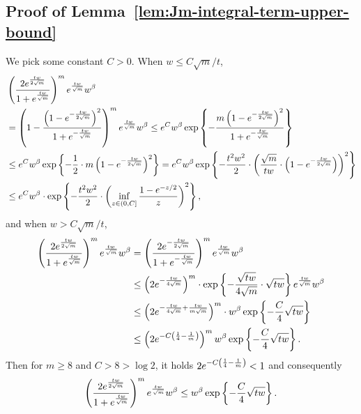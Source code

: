 \subsection{Proof of Lemma~\ref{lem:Jm-integral-term-upper-bound}} \label{proof:Jm-integral-term-upper-bound}
We pick some constant $C > 0$. When $w \leq C\sqrt{m}/t$,
\begin{align*}
	& \left({\frac{2e^{\frac{tw}{2\sqrt{m}}}}{1 + e^{\frac{tw}{\sqrt{m}}}}}\right)^{m} e^{\frac{tw}{\sqrt{m}}} w^\beta \nonumber \\
	& = \left({1 - \frac{\left({1-e^{-\frac{tw}{2\sqrt{m}}}}\right)^2}{1 + e^{-\frac{tw}{\sqrt{m}}}}}\right)^{m} e^{\frac{tw}{\sqrt{m}}} w^\beta \leq e^C  w^\beta  \exp \left\{{-\frac{m\left({1-e^{-\frac{tw}{2\sqrt{m}}}}\right)^2}{1 + e^{-\frac{tw}{\sqrt{m}}}} }\right\}  \nonumber \\
	&  \leq e^C  w^\beta \exp \left\{{-\frac{1}{2} \cdot m\left({1-e^{-\frac{tw}{2\sqrt{m}}}}\right)^2 }\right\} = e^C  w^\beta \exp \left\{{-\frac{t^2w^2}{2} \cdot \left({\frac{\sqrt{m}}{tw} \cdot \left({1-e^{-\frac{tw}{2\sqrt{m}}}}\right)}\right)^2 }\right\}  \nonumber \\
	& \leq e^C w^\beta \cdot \exp \left\{-\frac{t^2 w^2}{2} \cdot \left({\inf_{z \in (0, C]} \frac{1-e^{-z/2}}{z} }\right)^2 \right\} ,
\end{align*}
and when $w > C\sqrt{m}/t$,
\begin{align*}
	\left({\frac{2e^{\frac{tw}{2\sqrt{m}}}}{1 + e^{\frac{tw}{\sqrt{m}}}}}\right)^{m} e^{\frac{tw}{\sqrt{m}}} w^\beta & = \left({\frac{2e^{-\frac{tw}{2\sqrt{m}}}}{1 + e^{-\frac{tw}{\sqrt{m}}}}}\right)^{m} e^{\frac{tw}{\sqrt{m}}} w^\beta \nonumber \\
	& \leq \left({2e^{-\frac{tw}{4\sqrt{m}}}}\right)^m \cdot \exp \left\{{-\frac{\sqrt{tw}}{4\sqrt{m}} \cdot \sqrt{tw}}\right\} e^{\frac{tw}{\sqrt{m}}}w^\beta \nonumber \\
	& \leq \left({2e^{-\frac{tw}{4\sqrt{m}} + \frac{tw}{m\sqrt{m}}}}\right)^m \cdot w^\beta \exp \left\{{-\frac{C}{4} \sqrt{tw}}\right\} \nonumber \\
	& \leq \left({2e^{-C\left({\frac{1}{4} - \frac{1}{m}}\right)}}\right)^m  w^\beta \exp \left\{{-\frac{C}{4} \sqrt{tw}}\right\} .
\end{align*}
Then for $m \geq 8$ and $C > 8 > \log 2$, it holds $2e^{-C\left({\frac{1}{4} - \frac{1}{m}}\right)} < 1$ and consequently
\begin{align*}
	\left({\frac{2e^{\frac{tw}{2\sqrt{m}}}}{1 + e^{\frac{tw}{\sqrt{m}}}}}\right)^{m} e^{\frac{tw}{\sqrt{m}}} w^\beta \le w^\beta \exp \left\{{-\frac{C}{4} \sqrt{tw}}\right\}.
\end{align*}

